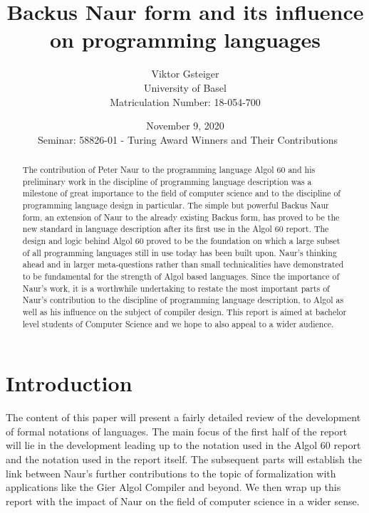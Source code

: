 \documentclass{article}
\author{Viktor Gsteiger \\ University of Basel \\ Matriculation Number: 18-054-700}
\title{Backus Naur form and its influence on programming languages}
\date{November 9, 2020 \\\ Seminar: 58826-01 - Turing Award Winners and Their Contributions}
\begin{document}
\maketitle

\begin{abstract}
	The contribution of Peter Naur to the programming language Algol 60 and his preliminary work in the discipline of programming language description was a milestone of great importance to the field of computer science and to the discipline of programming language design in particular. The simple but powerful Backus Naur form, an extension of Naur to the already existing Backus form, has proved to be the new standard in language description after its first use in the Algol 60 report. The design and logic behind Algol 60 proved to be the foundation on which a large subset of all programming languages still in use today has been built upon. Naur’s thinking ahead and in larger meta-questions rather than small technicalities have demonstrated to be fundamental for the strength of Algol based languages. Since the importance of Naur’s work, it is a worthwhile undertaking to restate the most important parts of Naur’s contribution to the discipline of programming language description, to Algol as well as his influence on the subject of compiler design. This report is aimed at bachelor level students of Computer Science and we hope to also appeal to a wider audience.
\end{abstract}

\newpage

\section{Introduction}
The content of this paper will present a fairly detailed review of the development of formal notations of languages. The main focus of the first half of the report will lie in the development leading up to the notation used in the Algol 60 report and the notation used in the report itself. The subsequent parts will establish the link between Naur's further contributions to the topic of formalization with applications like the Gier Algol Compiler and beyond. We then wrap up this report with the impact of Naur on the field of computer science in a wider sense.
\end{document}
